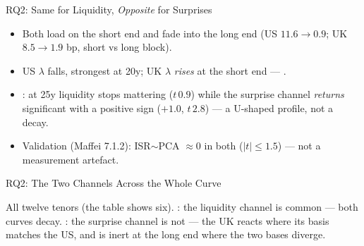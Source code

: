 \begin{frame}[t]{RQ2: Same for Liquidity, \emph{Opposite} for Surprises}
\vspace{0.15cm}
\raggedright\scriptsize
\begin{itemize}\itemsep=0.05cm\scriptsize
  \item {} Both load on the short end and fade into the long end
        (US $11.6\!\to\!0.9$; UK $8.5\!\to\!1.9$ bp, short vs long block).
  \item {} US $\lambda$ falls, strongest at 20y; UK $\lambda$
        \emph{rises} at the short end --- .
  \item {}: at 25y liquidity stops mattering
        ($t\,0.9$) while the surprise channel \emph{returns} significant with a positive sign
        ($+1.0$, $t\,2.8$) --- a U-shaped profile, not a decay.
  \item Validation (Maffei 7.1.2): ISR$\sim$PCA $\approx0$ in both ($|t|\leq1.5$) --- not a
        measurement artefact.
\end{itemize}
\end{frame}

\begin{frame}[t]{RQ2: The Two Channels Across the Whole Curve}
\vspace{0.1cm}

\vspace{0.1cm}
\footnotesize\centering
All twelve tenors (the table shows six). : the liquidity channel is common ---
both curves decay. : the surprise channel is not --- the UK reacts where its basis
matches the US, and is inert at the long end where the two bases diverge.
\end{frame}


